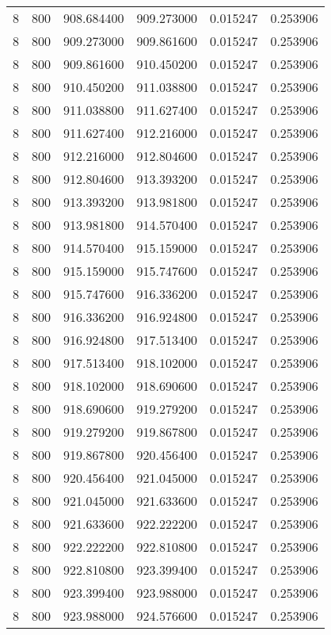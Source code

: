 \begin{longtable}{rrrrrr}
8 & 800 & 908.684400 & 909.273000 & 0.015247 & 0.253906 \\
8 & 800 & 909.273000 & 909.861600 & 0.015247 & 0.253906 \\
8 & 800 & 909.861600 & 910.450200 & 0.015247 & 0.253906 \\
8 & 800 & 910.450200 & 911.038800 & 0.015247 & 0.253906 \\
8 & 800 & 911.038800 & 911.627400 & 0.015247 & 0.253906 \\
8 & 800 & 911.627400 & 912.216000 & 0.015247 & 0.253906 \\
8 & 800 & 912.216000 & 912.804600 & 0.015247 & 0.253906 \\
8 & 800 & 912.804600 & 913.393200 & 0.015247 & 0.253906 \\
8 & 800 & 913.393200 & 913.981800 & 0.015247 & 0.253906 \\
8 & 800 & 913.981800 & 914.570400 & 0.015247 & 0.253906 \\
8 & 800 & 914.570400 & 915.159000 & 0.015247 & 0.253906 \\
8 & 800 & 915.159000 & 915.747600 & 0.015247 & 0.253906 \\
8 & 800 & 915.747600 & 916.336200 & 0.015247 & 0.253906 \\
8 & 800 & 916.336200 & 916.924800 & 0.015247 & 0.253906 \\
8 & 800 & 916.924800 & 917.513400 & 0.015247 & 0.253906 \\
8 & 800 & 917.513400 & 918.102000 & 0.015247 & 0.253906 \\
8 & 800 & 918.102000 & 918.690600 & 0.015247 & 0.253906 \\
8 & 800 & 918.690600 & 919.279200 & 0.015247 & 0.253906 \\
8 & 800 & 919.279200 & 919.867800 & 0.015247 & 0.253906 \\
8 & 800 & 919.867800 & 920.456400 & 0.015247 & 0.253906 \\
8 & 800 & 920.456400 & 921.045000 & 0.015247 & 0.253906 \\
8 & 800 & 921.045000 & 921.633600 & 0.015247 & 0.253906 \\
8 & 800 & 921.633600 & 922.222200 & 0.015247 & 0.253906 \\
8 & 800 & 922.222200 & 922.810800 & 0.015247 & 0.253906 \\
8 & 800 & 922.810800 & 923.399400 & 0.015247 & 0.253906 \\
8 & 800 & 923.399400 & 923.988000 & 0.015247 & 0.253906 \\
8 & 800 & 923.988000 & 924.576600 & 0.015247 & 0.253906 \\

\end{longtable}
